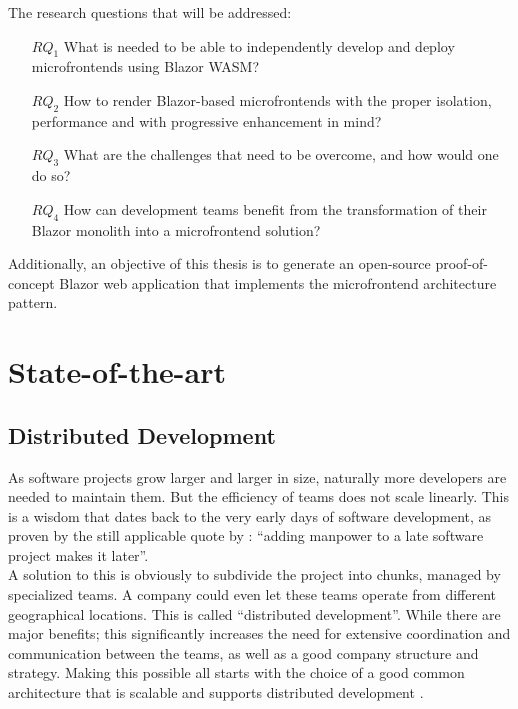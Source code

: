 The research questions that will be addressed:
\begin{itemize}
    \item[$RQ_1$] What is needed to be able to independently develop and
    deploy microfrontends using Blazor WASM?
    \item[$RQ_2$] How to render Blazor-based microfrontends with the proper
    isolation, performance and with progressive
    enhancement
    in mind?
    \item[$RQ_3$] What are the challenges that need to be overcome, and how
    would one do so? 
    \item[$RQ_4$] How can development teams benefit from the transformation
    of their Blazor monolith into a microfrontend solution?
\end{itemize}

Additionally, an objective of this thesis is to generate an open-source
proof-of-concept Blazor web application that implements the microfrontend
architecture pattern.




\section{State-of-the-art}
\label{sec:state-of-the-art}

\subsection{Distributed Development}
As software projects grow larger and larger in size, naturally more developers
are needed to maintain them. But the efficiency of teams does not scale
linearly. This is a wisdom that dates back to the very early days of software
development, as proven by the still applicable quote by \textcite{Brooks_1975}:
``adding manpower to a late software project makes it later''.\\
A solution to this is obviously to subdivide the project into chunks, managed by
specialized teams. A company could even let these teams operate from different
geographical locations. This is called ``distributed development''. While there
are major benefits; this significantly increases the need for extensive
coordination and communication between the teams, as well as a good company
structure and strategy. Making this possible all starts with the choice of a
good common architecture that is scalable and supports distributed development
\autocite{Yuhong_2008}. 

